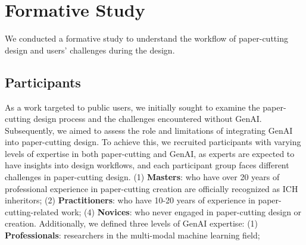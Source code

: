 \section{Formative Study}\label{sec:formative}
We conducted a formative study to understand the workflow of paper-cutting design and users' challenges during the design.


\subsection{Participants}
As a work targeted to public users, we initially sought to examine the paper-cutting design process and the challenges encountered without GenAI. Subsequently, we aimed to assess the role and limitations of integrating GenAI into paper-cutting design. To achieve this, we recruited participants with varying levels of expertise in both paper-cutting and GenAI, as experts are expected to have insights into design workflows, and each participant group faces different challenges in paper-cutting design. 
(1) \textbf{Masters}: who have over 20 years of professional experience in paper-cutting creation are officially recognized as ICH inheritors; (2) \textbf{Practitioners}: who have 10-20 years of experience in paper-cutting-related work;  (4) \textbf{Novices}: who never engaged in paper-cutting design or creation. Additionally, we defined three levels of GenAI expertise: (1) \textbf{Professionals}: researchers in the multi-modal machine learning field; 

